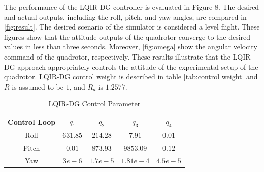 \documentclass[conference]{IEEEtran}
\begin{document}
The performance of the LQIR-DG controller is evaluated in Figure 8. The desired and actual outputs, including the roll, pitch, and yaw angles, are compared in \figurename{\ref{fig:result}}. The desired scenario of the simulator is considered a level flight. These figures show that the attitude outputs of the quadrotor converge to the desired values in less than three seconds. Moreover, \figurename{\ref{fig:omega}} show the angular velocity command of the quadrotor, 
respectively. These results illustrate that the LQIR-DG approach appropriately controls the attitude of the experimental setup of the quadrotor. LQIR-DG control weight is described in table \ref{tab:control weight} and $R$ is assumed to be $1$, and $R_d$ is $1.2577$.
\begin{table}[!h]\label{tab:control weight}
	\renewcommand{\arraystretch}{1.3}
	\caption{LQIR-DG Control Parameter}
	\begin{center}
	\begin{tabular}{c c c c c}
	\hline
	\textbf{Control Loop} & \textbf{\textit{$q_1$}}& \textbf{\textit{$q_2$}} 
	& \textbf{\textit{$q_3$}} & \textbf{\textit{$q_4$}} \\
	\hline
	Roll & 
	$631.85$ & $214.28$ & $7.91$ &
	$0.01$ \\
	Pitch & 
	$0.01$ & $873.93$ & $9853.09$ &
	$0.12$ \\
	Yaw & 
	$3e-6$ & $1.7e-5$ & $1.81e-4$ &
	$4.5e-5$ \\
	\hline
	\end{tabular}
	\label{tab2}
	\end{center}
\end{table}
\end{document}
